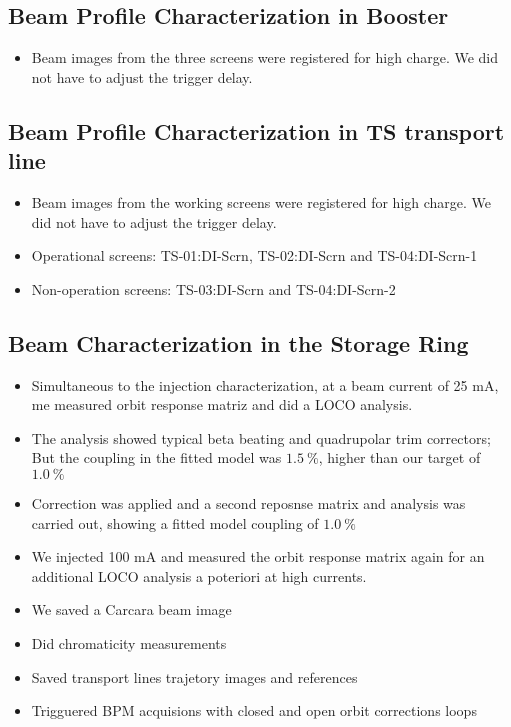 \documentclass{article}
\begin{document}
\subsection{Beam Profile Characterization in Booster}
\begin{itemize}
    \item Beam images from the three screens were registered for high charge. We did not have to adjust the trigger delay.
\end{itemize}

\subsection{Beam Profile Characterization in TS transport line}
\begin{itemize}
    \item Beam images from the working screens were registered for high charge. We did not have to adjust the trigger delay.
    \item Operational screens: TS-01:DI-Scrn, TS-02:DI-Scrn and TS-04:DI-Scrn-1
    \item Non-operation screens: TS-03:DI-Scrn and TS-04:DI-Scrn-2
\end{itemize}

\subsection{Beam Characterization in the Storage Ring}
\begin{itemize}
    \item Simultaneous to the injection characterization, at a beam current of 25 mA, me measured orbit response matriz and did a LOCO analysis.
    \item The analysis showed typical beta beating and quadrupolar trim correctors; But the coupling in the fitted model was $\SI{1.5}{\percent}$, higher than our target of $\SI{1.0}{\percent}$
    \item Correction was applied and a second reposnse matrix and analysis was carried out, showing a fitted model coupling of $\SI{1.0}{\percent}$
    \item We injected 100 mA and measured the orbit response matrix again for an additional LOCO analysis a poteriori at high currents.
    \item We saved a Carcara beam image
    \item Did chromaticity measurements
    \item Saved transport lines trajetory images and references
    \item Trigguered BPM acquisions with closed and open orbit corrections loops    
\end{itemize}

% 
% 
\end{document}
